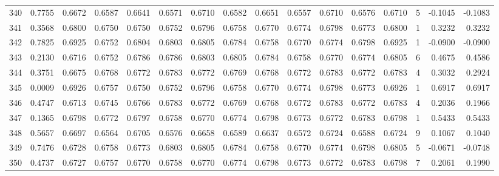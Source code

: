\begin{tabular}{lrrrrrrrrrrrrrrr}
340 &      0.7755 &  0.6672 &  0.6587 &  0.6641 &  0.6571 &  0.6710 &  0.6582 &  0.6651 &  0.6557 &  0.6710 &   0.6576 &     0.6710 &      5 &                   -0.1045 &                    -0.1083 \\
341 &      0.3568 &  0.6800 &  0.6750 &  0.6750 &  0.6752 &  0.6796 &  0.6758 &  0.6770 &  0.6774 &  0.6798 &   0.6773 &     0.6800 &      1 &                    0.3232 &                     0.3232 \\
342 &      0.7825 &  0.6925 &  0.6752 &  0.6804 &  0.6803 &  0.6805 &  0.6784 &  0.6758 &  0.6770 &  0.6774 &   0.6798 &     0.6925 &      1 &                   -0.0900 &                    -0.0900 \\
343 &      0.2130 &  0.6716 &  0.6752 &  0.6786 &  0.6786 &  0.6803 &  0.6805 &  0.6784 &  0.6758 &  0.6770 &   0.6774 &     0.6805 &      6 &                    0.4675 &                     0.4586 \\
344 &      0.3751 &  0.6675 &  0.6768 &  0.6772 &  0.6783 &  0.6772 &  0.6769 &  0.6768 &  0.6772 &  0.6783 &   0.6772 &     0.6783 &      4 &                    0.3032 &                     0.2924 \\
345 &      0.0009 &  0.6926 &  0.6757 &  0.6750 &  0.6752 &  0.6796 &  0.6758 &  0.6770 &  0.6774 &  0.6798 &   0.6773 &     0.6926 &      1 &                    0.6917 &                     0.6917 \\
346 &      0.4747 &  0.6713 &  0.6745 &  0.6766 &  0.6783 &  0.6772 &  0.6769 &  0.6768 &  0.6772 &  0.6783 &   0.6772 &     0.6783 &      4 &                    0.2036 &                     0.1966 \\
347 &      0.1365 &  0.6798 &  0.6772 &  0.6797 &  0.6758 &  0.6770 &  0.6774 &  0.6798 &  0.6773 &  0.6772 &   0.6783 &     0.6798 &      1 &                    0.5433 &                     0.5433 \\
348 &      0.5657 &  0.6697 &  0.6564 &  0.6705 &  0.6576 &  0.6658 &  0.6589 &  0.6637 &  0.6572 &  0.6724 &   0.6588 &     0.6724 &      9 &                    0.1067 &                     0.1040 \\
349 &      0.7476 &  0.6728 &  0.6758 &  0.6773 &  0.6803 &  0.6805 &  0.6784 &  0.6758 &  0.6770 &  0.6774 &   0.6798 &     0.6805 &      5 &                   -0.0671 &                    -0.0748 \\
350 &      0.4737 &  0.6727 &  0.6757 &  0.6770 &  0.6758 &  0.6770 &  0.6774 &  0.6798 &  0.6773 &  0.6772 &   0.6783 &     0.6798 &      7 &                    0.2061 &                     0.1990 \\

\end{tabular}
